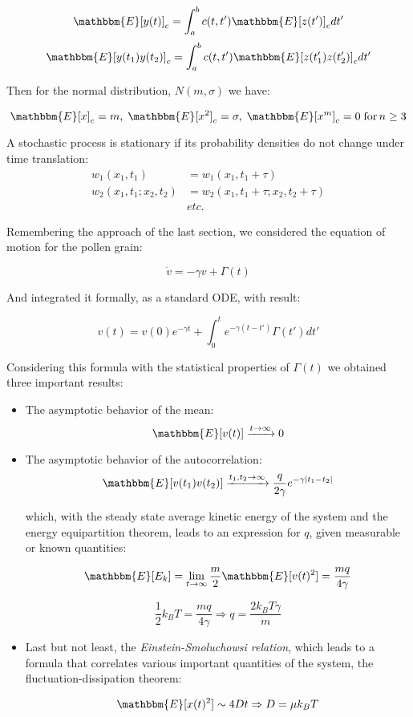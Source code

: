 \documentclass{article}
\begin{document}
$$ \mathbbm{E} [y(t)]_c = \int_{a}^{b} c(t,t') \mathbbm{E}[z(t')]_c dt' $$
$$ \mathbbm{E} [y(t_1)y(t_2)]_c = \int_{a}^{b} c(t,t') \mathbbm{E}[z(t_1') z(t_2')]_c dt'$$

Then for the normal distribution, $N(m,\sigma)$ we have:

$$ \mathbbm{E}[x]_c = m ,\; \mathbbm{E}[x^2]_c = \sigma, \; \mathbbm{E}[x^m]_c = 0 \;  \mathrm{for} \, n \geq 3 $$

A stochastic process is stationary if its probability densities do not change under time translation:
\begin{align*}
w_1(x_1,t_1) &=w_1(x_1,t_1+\tau)\\
w_2(x_1,t_1;x_2,t_2) &= w_2(x_1,t_1+\tau;x_2,t_2+\tau)\\ &\textit{etc.}
\end{align*}

Remembering the approach of the last section, we considered the equation of motion for the pollen grain:

$$ \dot{v} = - \gamma v + \Gamma(t) $$

And integrated it formally, as a standard ODE, with result:

\begin{equation}
v(t) = v(0) e^{-\gamma t} + \int_{0}^{t} e^{- \gamma (t-t')} \Gamma(t') dt'
\end{equation}

Considering this formula with the statistical properties of $\Gamma(t) $ we obtained three important results:

\begin{itemize}

\item The asymptotic behavior of the mean:
$$ \mathbbm{E}[v(t)] \xrightarrow{t\rightarrow \infty} 0$$

\item The asymptotic  behavior of the autocorrelation:
$$\mathbbm{E}[v(t_1)v(t_2)] \xrightarrow{t_1, t_2 \rightarrow \infty} \frac{q}{2\gamma} e^{-\gamma|t_1-t_2|} $$

which, with the steady state average kinetic energy of the system and the energy equipartition theorem, leads to an expression for $q$, given measurable or known quantities:

$$ \mathbbm{E}[E_k] = \lim\limits_{t \to \infty} \frac{m}{2} \mathbbm{E}[v(t)^2] = \frac{mq}{4\gamma}$$

$$ \frac{1}{2} k_B T =  \frac{mq}{4\gamma} \Rightarrow q = \frac{2k_B T \gamma}{m}$$

\item Last but not least, the \textit{Einstein-Smoluchowsi relation}, which leads to a formula that correlates various important quantities of the system, the fluctuation-dissipation theorem:

$$ \mathbbm{E}[x(t)^2] \sim 4 D t \Rightarrow D = \mu k_B T $$

\end{itemize}
\end{document}
